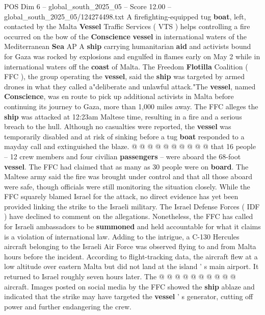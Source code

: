 \begin{textsample}{POS Dim 6 – global\_south\_2025\_05 – Score 12.00 – global\_south\_2025\_05/124274498.txt}  \label{ex:f6_pos_052}
A firefighting-equipped tug \textbf{boat}, left, contacted by the Malta \textbf{Vessel} Traffic Services ( VTS ) helps controlling a fire occurred on the bow of the \textbf{Conscience} \textbf{vessel} in international waters of the Mediterranean \textbf{Sea} AP A \textbf{ship} carrying humanitarian \textbf{aid} and activists bound for Gaza was rocked by explosions and engulfed in flames early on May 2 while in international waters off the \textbf{coast} of Malta.
The Freedom \textbf{Flotilla} Coalition ( FFC ), the group operating the \textbf{vessel}, said the \textbf{ship} was targeted by armed drones in what they called a"deliberate and unlawful attack."The \textbf{vessel}, named \textbf{Conscience}, was en route to pick up additional activists in Malta before continuing its journey to Gaza, more than 1,000 miles away.
The FFC alleges the \textbf{ship} was attacked at 12:23am Maltese time, resulting in a fire and a serious breach to the hull.
Although no casualties were reported, the \textbf{vessel} was temporarily disabled and at risk of sinking before a tug \textbf{boat} responded to a mayday call and extinguished the blaze. @ @ @ @ @ @ @ @ @ @ that 16 people -- 12 crew members and four civilian \textbf{passengers} -- were aboard the 68-foot \textbf{vessel}.
The FFC had claimed that as many as 30 people were on \textbf{board}.
The Maltese army said the fire was brought under control and that all those aboard were safe, though officials were still monitoring the situation closely.
While the FFC squarely blamed Israel for the attack, no direct evidence has yet been provided linking the strike to the Israeli military.
The Israel Defense Forces ( IDF ) have declined to comment on the allegations.
Nonetheless, the FFC has called for Israeli ambassadors to be \textbf{summoned} and held accountable for what it claims is a violation of international law.
Adding to the intrigue, a C-130 Hercules aircraft belonging to the Israeli Air Force was observed flying to and from Malta hours before the incident.
According to flight-tracking data, the aircraft flew at a low altitude over eastern Malta but did not land at the island ' s main airport.
It returned to Israel roughly seven hours later.
The @ @ @ @ @ @ @ @ @ @ aircraft.
Images posted on social media by the FFC showed the \textbf{ship} ablaze and indicated that the strike may have targeted the \textbf{vessel} ' s generator, cutting off power and further endangering the crew.

\end{textsample}
